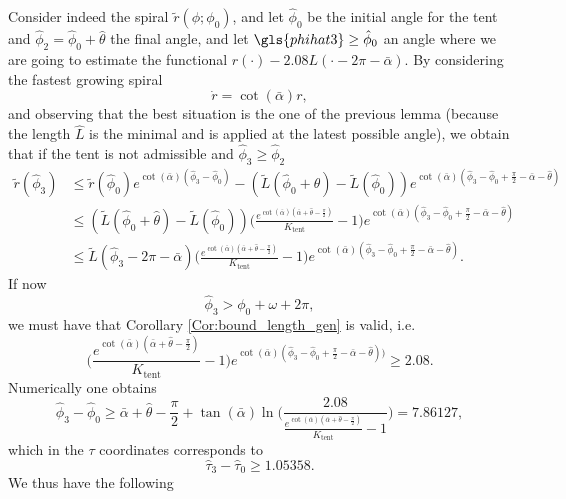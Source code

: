 \documentclass[reqno]{amsart}
\theoremstyle{definition} \newtheorem{definition}{Definition}[section]
\theoremstyle{definition} \newtheorem{remark}[definition]{Remark}
\theoremstyle{plain} \newtheorem{lemma}[definition]{Lemma}
\theoremstyle{plain} \newtheorem{proposition}[definition]{Proposition}
\theoremstyle{plain} \newtheorem{theorem}[definition]{Theorem}
\theoremstyle{plain} \newtheorem{corollary}[definition]{Corollary}
\theoremstyle{definition} \newtheorem{example}[definition]{Example}
\theoremstyle{plain} \newtheorem{claim}[clai]{Claim}
\theoremstyle{definition} \newtheorem{assumption}[definition]{Assumption}
\theoremstyle{definition} \newtheorem{observation}[definition]{Observation}
\newcommand{\1}{\mathbbm 1}
\numberwithin{equation}{section} %
\theoremstyle{plain} \newtheorem*{theorem*}{Theorem}
\theoremstyle{plain} \newtheorem{mthm}[maintheorem]{Main Theorem}
\theoremstyle{plain} \newtheorem*{mthm*}{Main Theorem}
\theoremstyle{plain} \newtheorem*{conjecture*}{Conjecture}
\theoremstyle{plain} \newtheorem{conjecture}[definition]{Conjecture}
\theoremstyle{plain} \newtheorem*{problem*}{Problem}
\begin{document}
Consider indeed the spiral $\tilde r(\phi;\phi_0)$, and let $\hat \phi_0$ be the initial angle for the tent and $\hat \phi_2 = \hat \phi_0 + \hat \theta$ the final angle, and let  $\gls{phihat3} \geq \hat \phi_0$ an angle where we are going to estimate the functional $r(\cdot) - 2.08 L(\cdot - 2\pi - \bar \alpha)$. By considering the fastest growing spiral
\begin{equation*}
\dot r = \cot(\bar \alpha) r,
\end{equation*}
and observing that the best situation is the one of the previous lemma (because the length $\hat L$ is the minimal and is applied at the latest possible angle), we obtain that if the tent is not admissible and $\hat \phi_3 \geq \hat \phi_2$
\begin{equation*}
\begin{split}
\tilde r(\hat \phi_3) &\leq \tilde r(\hat \phi_0) e^{\cot(\bar \alpha)(\hat \phi_3 - \hat \phi_0)} - (\tilde L(\hat \phi_0 + \hat \theta) - \tilde L(\hat \phi_0)) e^{\cot(\bar \alpha)(\hat \phi_3 - \hat \phi_0 + \frac{\pi}{2} - \bar \alpha - \hat \theta)} \\
&\leq (\tilde L(\hat \phi_0 + \hat \theta) - \tilde L(\hat \phi_0)) \bigg( \frac{e^{\cot(\bar \alpha) (\bar \alpha + \hat \theta - \frac{\pi}{2})}}{K_\mathrm{tent}} - 1 \bigg) e^{\cot(\bar \alpha) (\hat \phi_3 - \hat \phi_0 + \frac{\pi}{2} - \bar \alpha - \hat \theta)} \\
&\leq \tilde L(\hat \phi_3 - 2\pi - \bar \alpha) \bigg( \frac{e^{\cot(\bar \alpha) (\bar \alpha + \hat \theta - \frac{\pi}{2})}}{K_\mathrm{tent}} - 1 \bigg) e^{\cot(\bar \alpha) (\hat \phi_3 - \hat \phi_0 + \frac{\pi}{2} - \bar \alpha - \hat \theta)}.
\end{split}
\end{equation*}
If now
\begin{equation*}
\hat \phi_3 > \phi_0 + \omega + 2\pi,
\end{equation*}
we must have that Corollary \ref{Cor:bound_length_gen} is valid, i.e.
\begin{equation*}
\bigg( \frac{e^{\cot(\bar \alpha) (\bar \alpha + \hat \theta - \frac{\pi}{2})}}{K_\mathrm{tent}} - 1 \bigg) e^{\cot(\bar \alpha) (\hat \phi_3 - \hat \phi_0 + \frac{\pi}{2} - \bar \alpha - \hat \theta))} \geq 2.08.
\end{equation*}
Numerically one obtains
\begin{equation*}
\hat \phi_3 - \hat \phi_0 \geq \bar \alpha + \hat \theta - \frac{\pi}{2} + \tan(\bar \alpha) \ln \bigg( \frac{2.08}{\frac{e^{\cot(\bar \alpha) (\bar \alpha + \hat \theta - \frac{\pi}{2})}}{K_\mathrm{tent}} - 1} \bigg) = 7.86127,
\end{equation*}
which in the $\tau$ coordinates corresponds to
\begin{equation}
\label{Equa:hattau3_cond}
\hat \tau_3 - \hat \tau_0 \geq 1.05358.
\end{equation}
We thus have the following
\end{document}
